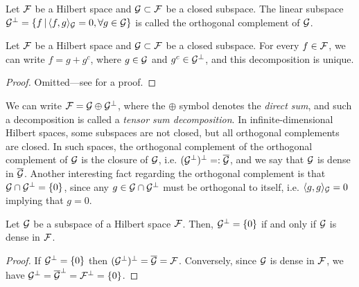 \begin{definition}
  Let ${\mathcal F}$ be a Hilbert space and ${\mathcal G} \subset {\mathcal F}$ be a closed subspace.
  The linear subspace ${\mathcal G}^\bot = \{ f \,|\, \langle f,g\rangle_{\mathcal G} = 0, \forall g \in {\mathcal G} \}$ is called the orthogonal complement of ${\mathcal G}$.
\end{definition}

\begin{theorem}
  Let ${\mathcal F}$ be a Hilbert space and ${\mathcal G} \subset {\mathcal F}$ be a closed subspace.
  For every $f \in {\mathcal F}$, we can write $f = g + g^c$, where $g \in {\mathcal G}$ and $g^c \in {\mathcal G}^\bot$, and this decomposition is unique.
\end{theorem}

\begin{proof}
  Omitted---see \citet[Theorem 4.11]{rudin1987real} for a proof.
\end{proof}

We can write ${\mathcal F} = {\mathcal G} \oplus {\mathcal G}^\bot$, where the $\oplus$ symbol denotes the \emph{direct sum}, and such a decomposition is called a \emph{tensor sum decomposition}.
In infinite-dimensional Hilbert spaces, some subspaces are not closed, but all orthogonal complements are closed. 
In such spaces, the orthogonal complement of the orthogonal complement of ${\mathcal G}$ is the closure of ${\mathcal G}$, i.e. $({\mathcal G}^\bot)^\bot =: \overline {{\mathcal G}}$, and we say that ${\mathcal G}$ is dense in $\overline {{\mathcal G}}$.
Another interesting fact regarding the orthogonal complement is that ${\mathcal G} \cap {\mathcal G}^\bot = \{ 0 \}$, since any $g\in {\mathcal G} \cap {\mathcal G}^\bot$ must be orthogonal to itself, i.e. $\langle g,g\rangle_{\mathcal G} = 0$ implying that $g=0$.

\begin{corollary}\label{thm:orthdecomp2}
  Let ${\mathcal G}$ be a subspace of a Hilbert space ${\mathcal F}$. 
  Then, ${\mathcal G}^\bot = \{0\}$ if and only if ${\mathcal G}$ is dense in ${\mathcal F}$.
\end{corollary}

\begin{proof}
  If ${\mathcal G}^\bot=\{0\}$ then $({\mathcal G}^\bot)^\bot = \overline {{\mathcal G}} = {\mathcal F}$.
  Conversely, since ${\mathcal G}$ is dense in ${\mathcal F}$, we have ${\mathcal G}^\bot = \overline{{\mathcal G}}^\bot = {\mathcal F}^\bot = \{0\}$.
\end{proof}

